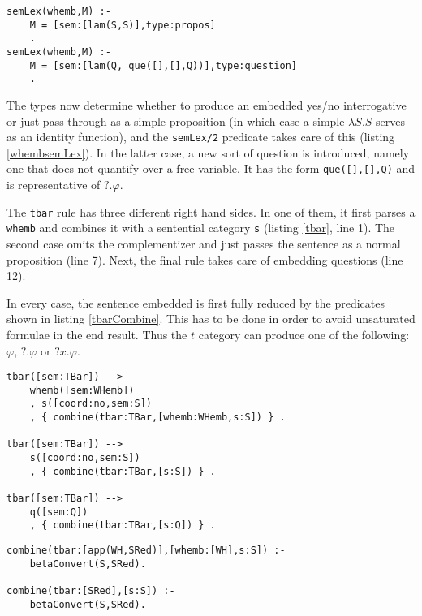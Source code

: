 \documentclass[a4paper]{article}
\newcommand{\code}[1]{\texttt{#1}} %
\theoremstyle{remark}
\theoremstyle{remark}
\theoremstyle{definition}
\theoremstyle{definition}
\begin{document}
\begin{lstlisting}[label=whembsemLex,caption={Semantic Rules for Complementizers},float]
semLex(whemb,M) :-
    M = [sem:[lam(S,S)],type:propos]
    .
semLex(whemb,M) :-
    M = [sem:[lam(Q, que([],[],Q))],type:question]
    .
\end{lstlisting}

The types now determine whether to produce an embedded yes/no
interrogative or just pass through as a simple proposition (in which case a
simple $\lambda S. S$ serves as an identity function), and the
\code{semLex/2} predicate takes care of this (listing \ref{whembsemLex}). In the
latter case, a new sort of question is introduced, namely one that does not
quantify over a free variable. It has the form \lstinline!que([],[],Q)! and is
representative of $?.\varphi$.

The \code{tbar} rule has three different right hand sides. 
In one of them, it first parses a \code{whemb} and combines it with a sentential
category \code{s} (listing \ref{tbar}, line 1). The second case omits the
complementizer and just passes the sentence as a normal proposition (line 7).
Next, the final rule takes care of embedding questions (line 12).

In every case, the sentence embedded is first fully reduced by the predicates
shown in listing \ref{tbarCombine}. This has to be done in order to avoid
unsaturated formulae in the end result. Thus the $\bar{t}$ category can   produce
one of the following: $\varphi$, $?.\varphi$ or $?x.\varphi$.

\begin{lstlisting}[label=tbar,caption={Semantic Rules for $\bar{t}$},float]
tbar([sem:TBar]) -->
    whemb([sem:WHemb])
    , s([coord:no,sem:S])
    , { combine(tbar:TBar,[whemb:WHemb,s:S]) } .

tbar([sem:TBar]) -->
    s([coord:no,sem:S])
    , { combine(tbar:TBar,[s:S]) } .
 
tbar([sem:TBar]) -->
    q([sem:Q])
    , { combine(tbar:TBar,[s:Q]) } .
\end{lstlisting}

\begin{lstlisting}[label=tbarCombine,caption={$\bar{t}$ is responsible for beta-converting the embedded sentence.},float]
combine(tbar:[app(WH,SRed)],[whemb:[WH],s:S]) :-
    betaConvert(S,SRed).

combine(tbar:[SRed],[s:S]) :-
    betaConvert(S,SRed).
\end{lstlisting}
\end{document}
